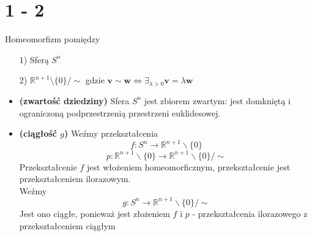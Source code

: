 \newpage
\section*{1 - 2}
Homeomorfizm pomiędzy
\begin{itemize}
  \item[1)] Sferą $S^n$
  \item[2)] $\mathbb{R} ^ {n+1} \setminus \{ 0 \} / \sim $ gdzie $ \mathbf{v} \sim  \mathbf{w} \iff \exists_{\lambda > 0}  \mathbf{v}=  \lambda \mathbf{w} $
\end{itemize}
\begin{itemize}

\item \textbf{(zwartość dziedziny)} Sfera $ S^n $ jest zbiorem zwartym: jest domkniętą i ograniczoną podprzestrzenią przestrzeni euklidesowej.\\

\item \textbf{(ciągłość $g$)} Weźmy przekształcenia
$$
f: S^n \rightarrow \mathbb{R}^{n+1} \backslash \{0\}
$$
$$
p: \mathbb{R}^{n+1} \backslash \{0\} \rightarrow \mathbb{R}^{n+1} \backslash \{0\} / \sim
$$
Przekształcenie $f$ jest włożeniem homeomorficznym, przekształcenie jest przekształceniem ilorazowym.
\\
Weźmy
$$ g: S^n \rightarrow \mathbb{R}^{n+1} \backslash \{0\} / \sim $$
Jest ono ciągłe, ponieważ jest złożeniem $f$ i $p$ - przekształcenia ilorazowego z przekształceniem ciągłym\\
\end{itemize}

